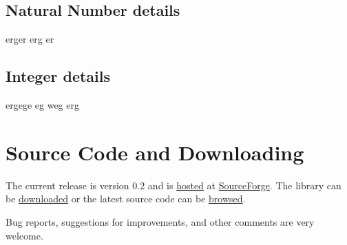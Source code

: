 \documentclass[a4paper]{article}
\begin{document}
\subsection{Natural Number details}

erger erg er

\subsection{Integer details}

ergege eg weg erg

\section{Source Code and Downloading}

The current release is version 0.2 and is \href{http://sourceforge.net/projects/sputsoftnumbers/}{hosted} at \href{http://sourceforge.net}{SourceForge}. The library can be \href{https://sourceforge.net/projects/sputsoftnumbers/files/}{downloaded} or the latest source code can be \href{http://sputsoftnumbers.svn.sourceforge.net/viewvc/sputsoftnumbers/trunk/}{browsed}.

Bug reports, suggestions for improvements, and other comments are very welcome.
\end{document}
